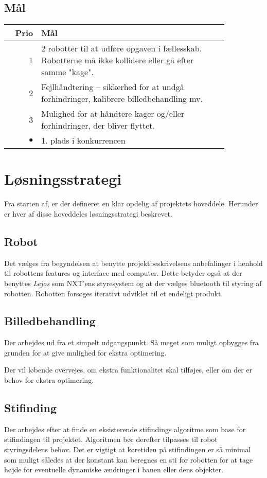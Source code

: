\subsection{Mål}
\begin{tabular}{r p{0.85\linewidth}}
	\textbf{Prio} & \textbf{Mål} \\
	\hline
	1 & 2 robotter til at udføre opgaven i fællesskab. Robotterne må ikke kollidere eller gå efter samme "kage".\\
	2 & Fejlhåndtering -- sikkerhed for at undgå forhindringer, kalibrere billedbehandling mv.\\
	3 & Mulighed for at håndtere kager og/eller forhindringer, der bliver flyttet. \\
	$\bullet$ & 1. plads i konkurrencen
\end{tabular}

\section{Løsningsstrategi}
Fra starten af, er der defineret en klar opdelig af projektets hoveddele. Herunder er hver af disse hoveddeles løsningsstrategi beskrevet.

\subsection{Robot}
Det vælges fra begyndelsen at benytte projektbeskrivelsens anbefalinger i henhold til robottens features og interface med computer.
Dette betyder også at der benyttes \textit{Lejos} som NXT'ens styresystem og at der vælges bluetooth til styring af robotten.
Robotten forsøges iterativt udviklet til et endeligt produkt.

\subsection{Billedbehandling}
Der arbejdes ud fra et simpelt udgangspunkt. Så meget som muligt opbygges fra grunden for at give mulighed for ekstra optimering.

Der vil løbende overvejes, om ekstra funktionalitet skal tilføjes, eller om der er behov for ekstra optimering.

\subsection{Stifinding}
Der arbejdes efter at finde en eksisterende stifindings algoritme som base for stifindingen til projektet. Algoritmen bør derefter tilpasses til robot styringsdelens behov.
Det er vigtigt at køretiden på stifindingen er så minimal som muligt således at der konstant kan beregnes en sti for robotten for at tage højde for eventuelle dynamiske ændringer i banen eller dens objekter.
